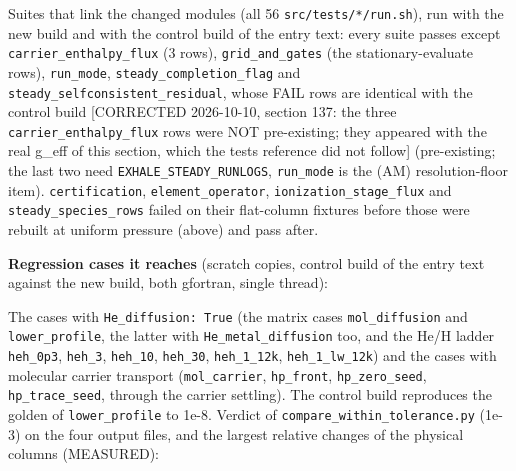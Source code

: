 \documentclass[english,a4paper]{my_memo}
\begin{document}
Suites that link the changed modules (all 56 \texttt{src/tests/*/run.sh}), run with
the new build and with the control build of the entry text: every suite
passes except \texttt{carrier\_enthalpy\_flux} (3 rows), \texttt{grid\_and\_gates} (the
stationary-evaluate rows), \texttt{run\_mode}, \texttt{steady\_completion\_flag} and
\texttt{steady\_selfconsistent\_residual}, whose FAIL rows are identical with the
control build {[}CORRECTED 2026-10-10, section 137: the three \texttt{carrier\_enthalpy\_flux}
rows were NOT pre-existing; they appeared with the real g\_eff of this section,
which the test\textquotesingle s reference did not follow{]} (pre-existing; the last two need \texttt{EXHALE\_STEADY\_RUNLOGS},
\texttt{run\_mode} is the (AM) resolution-floor item). \texttt{certification},
\texttt{element\_operator}, \texttt{ionization\_stage\_flux} and \texttt{steady\_species\_rows} failed
on their flat-column fixtures before those were rebuilt at uniform pressure
(above) and pass after.

\textbf{Regression cases it reaches} (scratch copies, control build of the entry
text against the new build, both gfortran, single thread):

The cases with \texttt{He\_diffusion:\ True} (the matrix cases \texttt{mol\_diffusion} and
\texttt{lower\_profile}, the latter with \texttt{He\_metal\_diffusion} too, and the He/H
ladder \texttt{heh\_0p3}, \texttt{heh\_3}, \texttt{heh\_10}, \texttt{heh\_30}, \texttt{heh\_1\_12k}, \texttt{heh\_1\_lw\_12k})
and the cases with molecular carrier transport (\texttt{mol\_carrier}, \texttt{hp\_front},
\texttt{hp\_zero\_seed}, \texttt{hp\_trace\_seed}, through the carrier settling). The control
build reproduces the golden of \texttt{lower\_profile} to 1e-8. Verdict of
\texttt{compare\_within\_tolerance.py} (1e-3) on the four output files, and the
largest relative changes of the physical columns (MEASURED):
\end{document}
